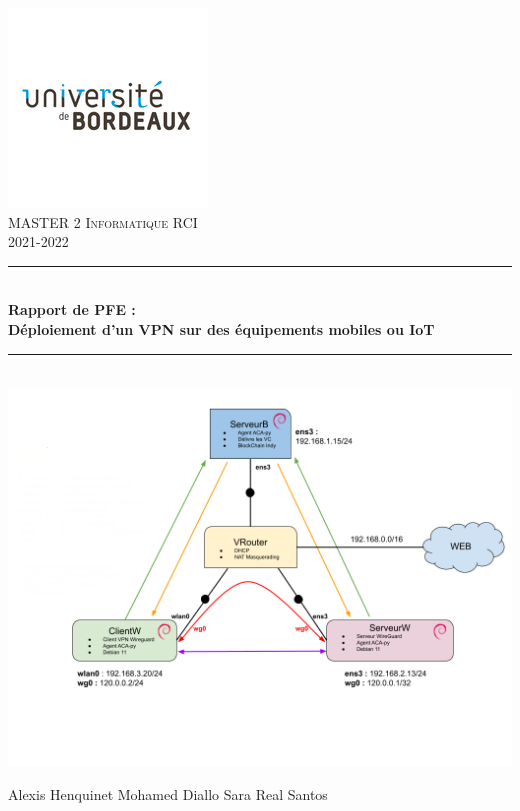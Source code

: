 \documentclass[12pt, openany]{report}
\begin{document}
\begin{titlepage}
  \begin{sffamily}
  \begin{center}
	\includegraphics[scale=0.5]{ub.png}~\\[1cm]

    \textsc{\Large MASTER 2 Informatique RCI }\\[1.5cm]
    2021-2022

    \rule{1\linewidth}{2pt}
     \\[1cm]
    { \huge \bfseries Rapport de PFE :\\
    Déploiement d'un VPN sur des équipements mobiles ou IoT\\[1cm] }
    \rule{1\linewidth}{2pt}
    \\[1cm]
    \includegraphics[scale=0.37]{topo.png}
    \\ %

   \vfill
      \begin{center}
        \Large	 Alexis Henquinet \hspace*{1cm} Mohamed Diallo \hspace*{1cm} Sara Real Santos
      \end{center}
 
 
  \end{center}
  \end{sffamily}
\end{titlepage}
\end{document}
